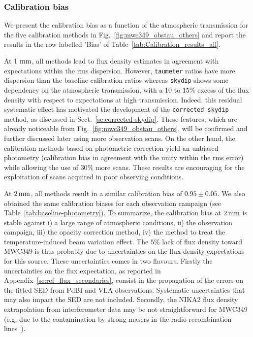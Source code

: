 \subsubsection{Calibration bias}
\label{se:calibration_bias_all}

We present the calibration bias as a function of the atmospheric
transmission for the five calibration methods in
Fig.~\ref{fig:mwc349_obstau_others} and report the results in the row
labelled 'Bias' of Table~\ref{tab:Calibration_results_all}.

At $1~\rm{mm}$, all methods lead to flux density estimates in
agreement with expectations within the rms dispersion. However,
{\tt taumeter} ratios have more dispersion than the baseline-calibration
ratios whereas {\tt skydip} shows some dependency on the atmospheric
transmission, with a 10 to $15\%$ excess of the flux density with
respect to expectations at high transmission. Indeed, this residual
systematic effect has motivated the development of the {\tt corrected
  skydip} method, as discussed in
Sect.~\ref{se:corrected-skydip}. These features, which are
already noticeable from Fig.~\ref{fig:mwc349_obstau_others}, will be
confirmed and further discussed later using more observation scans. On
the other hand, the calibration methods based on photometric correction yield an
unbiased photometry (calibration bias in agreement with the unity
within the rms error) while allowing the use of $30\%$ more scans. These results are
encouraging for the exploitation of scans acquired in poor
observing conditions.

At $2\,\rm{mm}$, all methods result in a similar calibration bias
of $0.95 \pm 0.05$. We also obtained the same calibration
biases for each observation campaign (see
Table~\ref{tab:baseline-photometry}). To summarize, the
calibration bias at $2\, \rm{mm}$ is stable against i) a large range of
atmospheric conditions, ii) the observation campaign, iii) the
opacity correction method, iv) the method to treat the
temperature-induced beam variation effect.
The $5\%$ lack of flux density toward MWC349 is thus probably due to
uncertainties on the flux density expectations for this source.
These uncertainties comes in two flavours.
{\lp Firstly the uncertainties on the flux expectation, as reported in
Appendix~\ref{se:ref_flux_secondaries}, consist in the propagation of
the errors on the fitted SED from PdBI and VLA observations. Systematic
uncertainties that may also impact the SED are not included.}  
Secondly, the NIKA2 flux density extrapolation from
interferometer data may be not straightforward for MWC349 (e.g. due to
the contamination by strong masers in the radio recombination
lines~\citep{masingRRL}).

